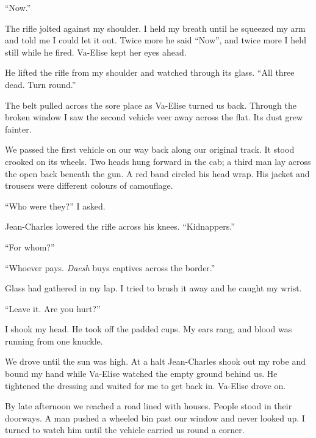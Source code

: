 ``Now.''\par

The rifle jolted against my shoulder. I held my breath until he squeezed my arm and told me I could let it out. Twice more he said ``Now'', and twice more I held still while he fired. Va-Elise kept her eyes ahead.\par

He lifted the rifle from my shoulder and watched through its glass. ``All three dead. Turn round.''\par

The belt pulled across the sore place as Va-Elise turned us back. Through the broken window I saw the second vehicle veer away across the flat. Its dust grew fainter.\par

We passed the first vehicle on our way back along our original track. It stood crooked on its wheels. Two heads hung forward in the cab; a third man lay across the open back beneath the gun. A red band circled his head wrap. His jacket and trousers were different colours of camouflage.\par

``Who were they?'' I asked.\par

Jean-Charles lowered the rifle across his knees. ``Kidnappers.''\par

``For whom?''\par

``Whoever pays. \textit{Daesh} buys captives across the border.''\par

Glass had gathered in my lap. I tried to brush it away and he caught my wrist.\par

``Leave it. Are you hurt?''\par

I shook my head. He took off the padded cups. My ears rang, and blood was running from one knuckle.\par

We drove until the sun was high. At a halt Jean-Charles shook out my robe and bound my hand while Va-Elise watched the empty ground behind us. He tightened the dressing and waited for me to get back in. Va-Elise drove on.\par

By late afternoon we reached a road lined with houses. People stood in their doorways. A man pushed a wheeled bin past our window and never looked up. I turned to watch him until the vehicle carried us round a corner.\par

